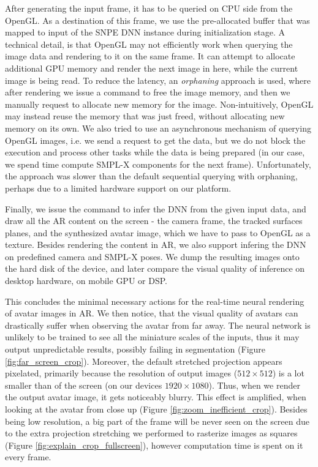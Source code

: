 After generating the input frame, it has to be queried on CPU side from the OpenGL. As a destination of this frame, we use the pre-allocated buffer that was mapped to input of the SNPE DNN instance during initialization stage. A technical detail, is that OpenGL may not efficiently work when querying the image data and rendering to it on the same frame. It can attempt to allocate additional GPU memory and render the next image in here, while the current image is being read. To reduce the latency, an \textit{orphaning} approach is used, where after rendering we issue a command to free the image memory, and then we manually request to allocate new memory for the image. Non-intuitively, OpenGL may instead reuse the memory that was just freed, without allocating new memory on its own. We also tried to use an asynchronous mechanism of querying OpenGL images, i.e. we send a request to get the data, but we do not block the execution and process other tasks while the data is being prepared (in our case, we spend time compute SMPL-X components for the next frame). Unfortunately, the approach was slower than the default sequential querying with orphaning, perhaps due to a limited hardware support on our platform.

Finally, we issue the command to infer the DNN from the given input data, and draw all the AR content on the screen - the camera frame, the tracked surfaces planes, and the synthesized avatar image, which we have to pass to OpenGL as a texture. Besides rendering the content in AR, we also support infering the DNN on predefined camera and SMPL-X poses. We dump the resulting images onto the hard disk of the device, and later compare the visual quality of inference on desktop hardware, on mobile GPU or DSP.

This concludes the minimal necessary actions for the real-time neural rendering of avatar images in AR. We then notice, that the visual quality of avatars can drastically suffer when observing the avatar from far away. The neural network is unlikely to be trained to see all the miniature scales of the inputs, thus it may output unpredictable results, possibly failing in segmentation (Figure \ref{fig:far_screen_crop}). Moreover, the default stretched projection appears pixelated, primarily because the resolution of output images ($512 \times 512$) is a lot smaller than of the screen (on our devices $1920 \times 1080$). Thus, when we render the output avatar image, it gets noticeably blurry. This effect is amplified, when looking at the avatar from close up (Figure \ref{fig:zoom_inefficient_crop}). Besides being low resolution, a big part of the frame will be never seen on the screen due to the extra projection stretching we performed to rasterize images as squares (Figure \ref{fig:explain_crop_fullscreen}), however computation time is spent on it every frame. 


